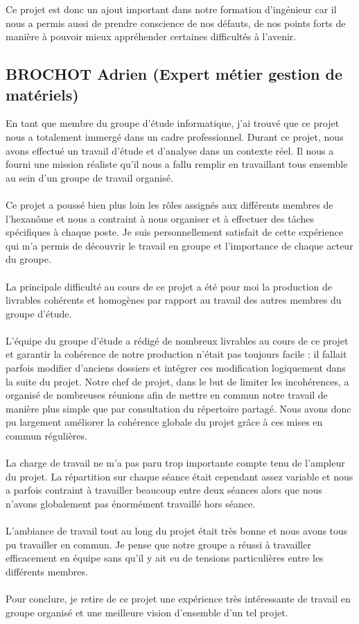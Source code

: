 Ce projet est donc un ajout important dans notre formation d'ingénieur car il nous a permis aussi de prendre conscience de nos défauts, de nos points forts de manière à pouvoir mieux appréhender certaines difficultés à l'avenir. 

       \subsection{BROCHOT Adrien (Expert métier gestion de matériels)}

En tant que membre du groupe d'étude informatique, j'ai trouvé que ce projet nous a totalement immergé dans un cadre professionnel. Durant ce projet, nous avons effectué un travail d'étude et d'analyse dans un contexte réel. Il nous a fourni une mission réaliste qu'il nous a fallu remplir en travaillant tous ensemble au sein d'un groupe de travail organisé.\\
\\
Ce projet a poussé bien plus loin les rôles assignés aux différents membres de l'hexanôme et nous a contraint à nous organiser et à effectuer des tâches spécifiques à chaque poste. Je suis personnellement satisfait de cette expérience qui m'a permis de découvrir le travail en groupe et l'importance de chaque acteur du groupe.\\
\\
La principale difficulté au cours de ce projet a été pour moi la production de livrables cohérents et homogènes par rapport au travail des autres membres du groupe d'étude.\\
\\
L'équipe du groupe d'étude a rédigé de nombreux livrables au cours de ce projet et garantir la cohérence de notre production n'était pas toujours facile : il fallait parfois modifier d'anciens dossiers et intégrer ces modification logiquement dans la suite du projet. Notre chef de projet, dans le but de limiter les incohérences, a organisé de nombreuses réunions afin de mettre en commun notre travail de manière plus simple que par consultation du répertoire partagé. Nous avons donc pu largement améliorer la cohérence globale du projet grâce à ces mises en commun régulières.\\
\\
La charge de travail ne m'a pas paru trop importante compte tenu de l'ampleur du projet. La répartition sur chaque séance était cependant assez variable et nous a parfois contraint à travailler beaucoup entre deux séances alors que nous n'avons globalement pas énormément travaillé hors séance.\\
\\
L'ambiance de travail tout au long du projet était très bonne et nous avons tous pu travailler en commun. Je pense que notre groupe a réussi à travailler efficacement en équipe sans qu'il y ait eu de tensions particulières entre les différents membres.\\
\\
Pour conclure, je retire de ce projet une expérience très intéressante de travail en groupe organisé et une meilleure vision d'ensemble d'un tel projet.


